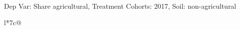 \begin{table}[H]
\captionlistentry[table]{}
\label{table:beaver_land_class_DVis_land_class_1_SCg2_SSNAG}
\scriptsize %
Dep Var: Share agricultural, Treatment Cohorts: 2017, Soil: non-agricultural \\
\begin{threeparttable}
\begin{tabulary}{\textwidth}{l*{7}{c}@{}}
\toprule \toprule
\noalign{\smallskip}
\noalign{\smallskip}
\midrule \bottomrule
\end{tabulary}
\medskip
\end{threeparttable}
\end{table}
